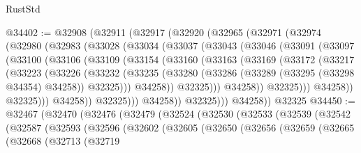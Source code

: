 \begin{lexlean}{RustStd}
\begin{coremodule}
@34402 := @32908
    (@32911
      (@32917
        (@32920
          (@32965
            (@32971
              (@32974
                (@32980
                  (@32983
                    (@33028
                      (@33034
                        (@33037
                          (@33043
                            (@33046
                              (@33091
                                (@33097
                                  (@33100
                                    (@33106
                                      (@33109
                                        (@33154
                                          (@33160
                                            (@33163
                                              (@33169
                                                (@33172
                                                  (@33217
                                                    (@33223
                                                      (@33226
                                                        (@33232
                                                          (@33235
                                                            (@33280
                                                              (@33286
                                                                (@33289
                                                                  (@33295 (@33298 @34354) @34258))
                                                                @32325)))
                                                          @34258))
                                                      @32325)))
                                                @34258))
                                            @32325)))
                                      @34258))
                                  @32325)))
                            @34258))
                        @32325)))
                  @34258))
              @32325)))
        @34258))
    @32325
@34450 := @32467
    (@32470
      (@32476
        (@32479
          (@32524
            (@32530
              (@32533
                (@32539
                  (@32542
                    (@32587
                      (@32593
                        (@32596
                          (@32602
                            (@32605
                              (@32650
                                (@32656
                                  (@32659
                                    (@32665
                                      (@32668
                                        (@32713
                                          (@32719

\end{coremodule}
\end{lexlean}
